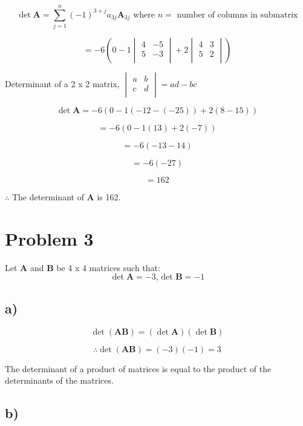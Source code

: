 \documentclass[12pt, a4paper]{article}
\begin{document}
\[
    \det\boldsymbol{A} = \sum_{j=1}^n (-1)^{3 + j} a_{3j}\boldsymbol{A}_{3j} \text { where } n = \text{ number of columns in submatrix}
\]

\[
    = -6\left(0 - 1\begin{vmatrix}
        4 & -5 \\
        5 & -3 \\
    \end{vmatrix} + 2\begin{vmatrix}
        4 & 3 \\
        5 & 2 \\
    \end{vmatrix} \right)
\]

Determinant of a 2 x 2 matrix, $\begin{vmatrix}
    a & b \\
    c & d \\
\end{vmatrix} = ad - bc$

\[
    \det\boldsymbol{A} = -6(0 - 1(-12 - (-25)) + 2(8 - 15))
\]

\[
    = -6(0 - 1(13) + 2(-7))
\]

\[
    = -6(-13-14)
\]

\[
    = -6(-27)
\]

\[
    = 162
\]

$\therefore$ The determinant of $\boldsymbol{A}$ is 162.

\section*{Problem 3}
Let $\boldsymbol{A}$ and $\boldsymbol{B}$ be 4 x 4 matrices such that:
\[
    \det \boldsymbol{A} = -3 \text{, det } \boldsymbol{B} = -1
\]

\subsection*{a)}

\[
    \det(\boldsymbol{AB}) = (\det\boldsymbol{A}) (\det\boldsymbol{B})
\]

\[
    \therefore \det(\boldsymbol{AB}) = (-3)(-1) = 3
\]

The determinant of a product of matrices is equal to the product of the determinants of the matrices.

\subsection*{b)}
\end{document}
